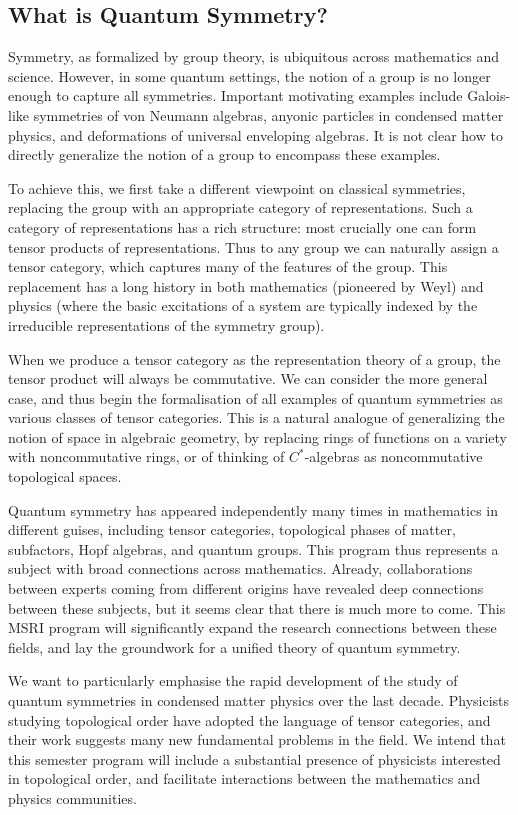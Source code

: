 \documentclass[11pt]{article}
\begin{document}
\subsection{What is Quantum Symmetry?}

Symmetry, as formalized by group theory, is ubiquitous across mathematics and
science.  However, in some quantum settings, the notion of a group is no
longer enough to capture all symmetries.  Important motivating examples
include Galois-like symmetries of von Neumann algebras, anyonic particles in
condensed matter physics, and deformations of universal enveloping algebras.
It is not clear how to directly generalize the notion of a group to encompass
these examples.

To achieve this, we first take a different viewpoint on classical symmetries,
replacing the group with an appropriate category of representations.  Such a
category of representations has a rich structure: most crucially one can form
tensor products of representations.  Thus to any group we can naturally assign
a tensor category, which captures many of the features of the group. This
replacement has a long history in both mathematics (pioneered by Weyl) and
physics (where the basic excitations of a system are typically indexed by the
irreducible representations of the symmetry group).

When we produce a tensor category as the representation theory of a group, the
tensor product will always be commutative. We can consider the more general
case, and thus begin the formalisation of all examples of quantum symmetries
as various classes of tensor categories. This is a natural analogue of
generalizing the notion of space in algebraic geometry, by replacing rings of
functions on a variety with noncommutative rings, or of thinking of
$C^*$-algebras as noncommutative topological spaces.

Quantum symmetry has appeared independently many times in mathematics in
different guises, including tensor categories, topological phases of matter,
subfactors, Hopf algebras, and quantum groups. This program thus represents a
subject with broad connections across mathematics. Already, collaborations
between experts coming from different origins have revealed deep connections
between these subjects, but it seems clear that there is much more to come.
This MSRI program will significantly expand the research connections between
these fields, and lay the groundwork for a unified theory of quantum symmetry.

We want to particularly emphasise the rapid development of the study of
quantum symmetries in condensed matter physics over the last decade.
Physicists studying topological order have adopted the language of tensor
categories, and their work suggests many new fundamental problems in the
field. We intend that this semester program will include a substantial
presence of physicists interested in topological order, and facilitate
interactions between the mathematics and physics communities.
\end{document}
